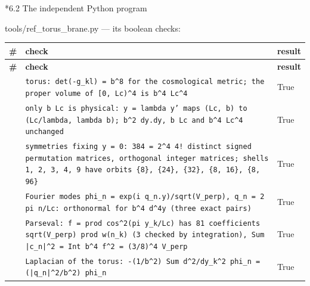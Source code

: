 \documentclass[10pt,a4paper]{article}
\makeatletter
\renewcommand\subsection{\@startsection{subsection}{2}{\z@}{-3.25ex\@plus -1ex \@minus -.2ex}{1.5ex \@plus .2ex}{\normalfont\large\bfseries\raggedright}}
\makeatother
\begin{document}
\subsection*{6.2 The independent Python program}
tools/ref\_torus\_brane.py — its boolean checks:

{\footnotesize
\begin{longtable}{>{\raggedright\arraybackslash}p{}>{\raggedright\arraybackslash}p{}>{\raggedright\arraybackslash}p{}}
\toprule
\textbf{\#} & \textbf{check} & \textbf{result} \\
\midrule\endfirsthead
\toprule
\textbf{\#} & \textbf{check} & \textbf{result} \\
\midrule\endhead
\endfoot
\bottomrule\endlastfoot
1 & \texttt{torus: det(-g\_\allowbreak{}kl) = b\textasciicircum{}8 for the cosmological metric; the proper volume of [0, Lc)\textasciicircum{}4 is b\textasciicircum{}4 Lc\textasciicircum{}4} & True \\
2 & \texttt{only b Lc is physical: y = lambda y' maps (Lc, b) to (Lc/\allowbreak{}lambda, lambda b); b\textasciicircum{}2 dy.dy, b Lc and b\textasciicircum{}4 Lc\textasciicircum{}4 unchanged} & True \\
3 & \texttt{symmetries fixing y = 0: 384 = 2\textasciicircum{}4 4! distinct signed permutation matrices, orthogonal integer matrices; shells 1, 2, 3, 4, 9 have orbits \{8\}, \{24\}, \{32\}, \{8, 16\}, \{8, 96\}} & True \\
4 & \texttt{Fourier modes phi\_\allowbreak{}n = exp(i q\_\allowbreak{}n.y)/\allowbreak{}sqrt(V\_\allowbreak{}perp), q\_\allowbreak{}n = 2 pi n/\allowbreak{}Lc: orthonormal for b\textasciicircum{}4 d\textasciicircum{}4y (three exact pairs)} & True \\
5 & \texttt{Parseval: f = prod cos\textasciicircum{}2(pi y\_\allowbreak{}k/\allowbreak{}Lc) has 81 coefficients sqrt(V\_\allowbreak{}perp) prod w(n\_\allowbreak{}k) (3 checked by integration), Sum |c\_\allowbreak{}n|\textasciicircum{}2 = Int b\textasciicircum{}4 f\textasciicircum{}2 = (3/\allowbreak{}8)\textasciicircum{}4 V\_\allowbreak{}perp} & True \\
6 & \texttt{Laplacian of the torus: -(1/\allowbreak{}b\textasciicircum{}2) Sum d\textasciicircum{}2/\allowbreak{}dy\_\allowbreak{}k\textasciicircum{}2 phi\_\allowbreak{}n = (|q\_\allowbreak{}n|\textasciicircum{}2/\allowbreak{}b\textasciicircum{}2) phi\_\allowbreak{}n} & True \\

\end{longtable}}
\end{document}
